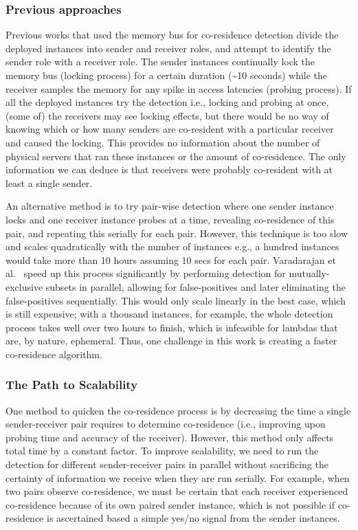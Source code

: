 \subsubsection{Previous approaches}
Previous works that used the memory bus for co-residence detection divide the
deployed instances into sender and receiver roles, and attempt to identify the
sender role with a receiver role. The sender instances continually lock the
memory bus (locking process) for a certain duration (\textasciitilde 10 seconds)
while the receiver samples the memory for any spike in access latencies (probing
process). If all the deployed instances try the detection i.e., locking and
probing at once, (some of) the receivers may see locking effects, but there
would be no way of knowing which or how many senders are co-resident with a
particular receiver and caused the locking. This provides no information about
the number of physical servers that ran these instances or the amount of
co-residence. The only information we can deduce is that receivers were probably
co-resident with at least a single sender.

An alternative method is to try pair-wise detection where one sender instance
locks and one receiver instance probes at a time, revealing co-residence of this
pair, and repeating this serially for each pair. However, this technique is too
slow and scales quadratically with the number of instances e.g., a hundred
instances would take more than 10 hours assuming 10 secs for each pair.
Varadarajan et al.~\cite{varad191016} speed up this process significantly by
performing detection for mutually-exclusive subsets in parallel, allowing for
false-positives and later eliminating the false-positives sequentially. This
would only scale linearly in the best case, which is still expensive; with a
thousand instances, for example, the whole detection process takes well over two
hours to finish, which is infeasible for lambdas that are, by nature, ephemeral.
Thus, one challenge in this work is creating a faster co-residence
algorithm.

\subsubsection{The Path to Scalability}

One method to quicken the co-residence process is by decreasing the time a single
sender-receiver pair requires to determine co-residence (i.e., improving upon
probing time and accuracy of the receiver). However, this method only affects
total time by a constant factor. To improve scalability, we need to
run the detection for different sender-receiver pairs in parallel without
sacrificing the certainty of information we receive when they are run serially.  For
example, when two pairs observe co-residence, we must be certain that each
receiver experienced co-residence because of its own paired sender instance, which
is not possible if co-residence is ascertained based a simple yes/no signal from
the sender instances. 

